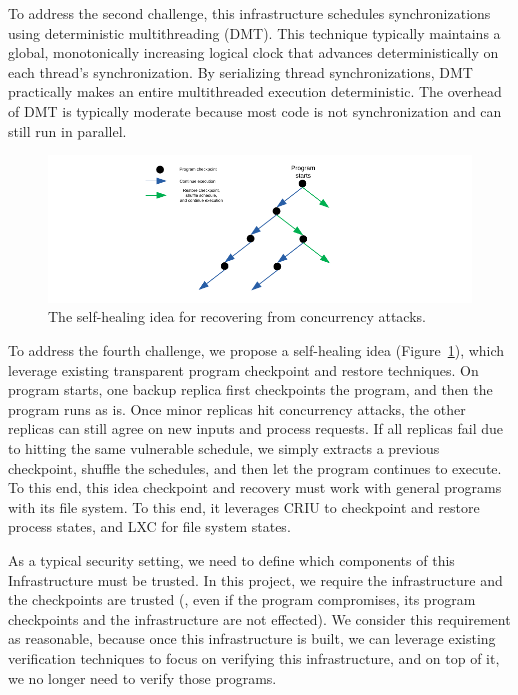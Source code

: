 To address the second challenge, this infrastructure schedules synchronizations 
using deterministic multithreading (DMT). This technique
typically maintains a global, monotonically increasing logical clock that 
advances deterministically on each thread's synchronization. By serializing 
thread synchronizations, DMT practically makes an entire multithreaded 
execution deterministic. The overhead
of DMT is typically moderate because most code is not synchronization and can 
still run in parallel.

\begin{figure}[ht]
\centering
\includegraphics[width=0.3\columnwidth]{figures/healing}
\vspace{-.05in}
\caption{{The self-healing idea for recovering from concurrency attacks.}} 
\label{fig:healing}
\vspace{-.05in}
\end{figure}

To address the fourth challenge, we propose a self-healing idea 
(Figure~\ref{fig:healing}), which leverage existing transparent program 
checkpoint and restore techniques. On program starts, one backup replica first 
checkpoints the program, and then the program runs as is. Once minor replicas 
hit concurrency attacks, the other replicas can still agree on new inputs and 
process requests. If all replicas fail due to hitting the same vulnerable 
schedule, we simply extracts a previous checkpoint, shuffle the schedules, and 
then let the program continues to execute. To this end, this idea checkpoint 
and recovery must work with general programs with its file system. To this end, 
it leverages CRIU to checkpoint and restore process states, and LXC for file 
system states.

As a typical security setting, we need to define which components of 
this Infrastructure must be trusted. In this project, we require the 
infrastructure and the checkpoints are trusted (\ie, even if the program 
compromises, its program checkpoints and the infrastructure are not effected). 
We consider this requirement as reasonable, because once this infrastructure is 
built, we can leverage existing verification techniques to focus on verifying 
this infrastructure, and on top of it, we no longer need to verify those 
programs.




